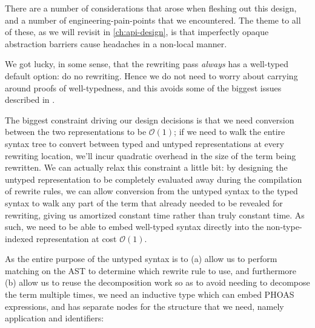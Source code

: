 There are a number of considerations that arose when fleshing out this design, and a number of engineering-pain-points that we encountered.
The theme to all of these, as we will revisit in \autoref{ch:api-design}, is that imperfectly opaque abstraction barriers cause headaches in a non-local manner.

We got lucky, in some sense, that the rewriting pass \emph{always} has a well-typed default option: do no rewriting.
Hence we do not need to worry about carrying around proofs of well-typedness, and this avoids some of the biggest issues described in .

The biggest constraint driving our design decisions is that we need conversion between the two representations to be $\mathcal{O}(1)$; if we need to walk the entire syntax tree to convert between typed and untyped representations at every rewriting location, we'll incur quadratic overhead in the size of the term being rewritten.
We can actually relax this constraint a little bit: by designing the untyped representation to be completely evaluated away during the compilation of rewrite rules, we can allow conversion from the untyped syntax to the typed syntax to walk any part of the term that already needed to be revealed for rewriting, giving us amortized constant time rather than truly constant time.
As such, we need to be able to embed well-typed syntax directly into the non-type-indexed representation at cost $\mathcal{O}(1)$.

As the entire purpose of the untyped syntax is to (a) allow us to perform matching on the AST to determine which rewrite rule to use, and furthermore (b) allow us to reuse the decomposition work so as to avoid needing to decompose the term multiple times, we need an inductive type which can embed PHOAS expressions, and has separate nodes for the structure that we need, namely application and identifiers:

